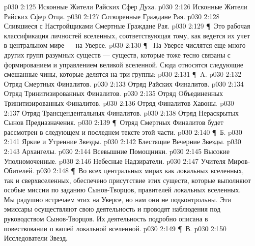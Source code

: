 \vs p030 2:125 \bibnobreakspace Исконные Жители Райских Сфер Духа.
\vs p030 2:126 \bibnobreakspace Исконные Жители Райских Сфер Отца.
\vs p030 2:127 \bibnobreakspace Сотворенные Граждане Рая.
\vs p030 2:128 \bibnobreakspace Слившиеся с Настройщиками Смертные Граждане Рая.
\vs p030 2:129 \P\ Это рабочая классификация личностей вселенных, соответствующая тому, как ведется их учет в центральном мире --- на Уверсе.
\vs p030 2:130 \P\  На Уверсе числятся еще много других групп разумных существ --- существ, которые тоже тесно связаны с формированием и управлением великой вселенной. Сюда относятся следующие смешанные чины, которые делятся на три группы:
\vs p030 2:131 \P\ A. 
\vs p030 2:132 \bibnobreakspace Отряд Смертных Финалитов.
\vs p030 2:133 \bibnobreakspace Отряд Райских Финалитов.
\vs p030 2:134 \bibnobreakspace Отряд Тринитизированных Финалитов.
\vs p030 2:135 \bibnobreakspace Отряд Oбъединенных Тринитизированных Финалитов.
\vs p030 2:136 \bibnobreakspace Отряд Финалитов Хавоны.
\vs p030 2:137 \bibnobreakspace Отряд Трансцендентальных Финалитов.
\vs p030 2:138 \bibnobreakspace Отряд Нераскрытых Сынов Предназначения.
\vs p030 2:139 \P\ Отряд Смертных Финалитов будет рассмотрен в следующем и последнем тексте этой части.
\vs p030 2:140 \P\ Б. 
\vs p030 2:141 \bibnobreakspace Яркие и Утренние Звезды.
\vs p030 2:142 \bibnobreakspace Блестящие Вечерние Звезды.
\vs p030 2:143 \bibnobreakspace Архангелы.
\vs p030 2:144 \bibnobreakspace Всевышние Помощники.
\vs p030 2:145 \bibnobreakspace Высокие Уполномоченные.
\vs p030 2:146 \bibnobreakspace Небесные Надзиратели.
\vs p030 2:147 \bibnobreakspace Учителя Миров\hyp{}Обителей.
\vs p030 2:148 \P\ Во всех центральных мирах как локальных вселенных, так и сверхвселенных, обеспечено присутствие этих существ, которые выполняют особые миссии по заданию Сынов\hyp{}Творцов, правителей локальных вселенных. Мы радушно встречаем этих  на Уверсе, но нам они не подконтрольны. Эти эмиссары осуществляют свою деятельность и проводят наблюдения под руководством Сынов\hyp{}Творцов. Их деятельность подробно описана в повествовании о вашей локальной вселенной.
\vs p030 2:149 \P\ В. 
\vs p030 2:150 \bibnobreakspace Исследователи Звезд.
